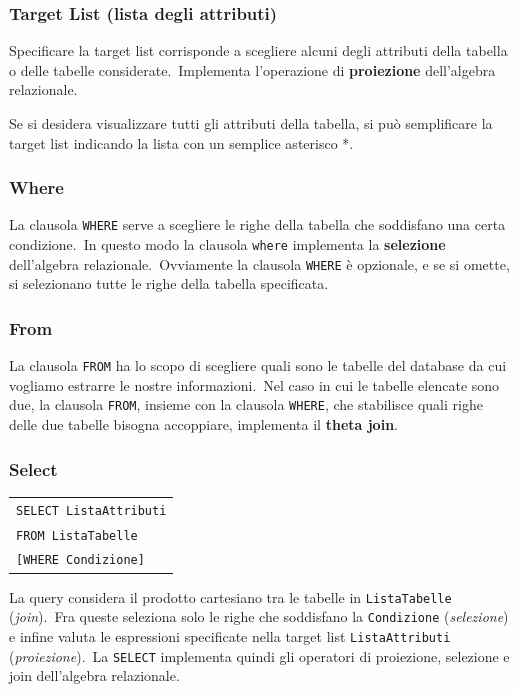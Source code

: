 \subsubsection{Target List (lista degli attributi)}

Specificare la target list corrisponde a scegliere alcuni degli attributi della tabella o delle tabelle considerate.\
Implementa l'operazione di \textbf{proiezione} dell'algebra relazionale.

Se si desidera visualizzare tutti gli attributi della tabella, si può semplificare la target list indicando la lista con un semplice asterisco *.\
\subsubsection{Where}

La clausola \texttt{WHERE} serve a scegliere le righe della tabella che soddisfano una certa condizione.\
In questo modo la clausola \texttt{where} implementa la \textbf{selezione} dell'algebra relazionale.\
Ovviamente la clausola \texttt{WHERE} è opzionale, e se si omette, si selezionano tutte le righe della tabella specificata.

\subsubsection{From}

La clausola \texttt{FROM} ha lo scopo di scegliere quali sono le tabelle del database da cui vogliamo estrarre le nostre informazioni.\
Nel caso in cui le tabelle elencate sono due, la clausola \texttt{FROM}, insieme con la clausola \texttt{WHERE}, che stabilisce quali righe delle due tabelle bisogna accoppiare, implementa il \textbf{theta join}.

\subsubsection{Select}
\begin{table}[H]
	\centering
	\begin{tabular}{l}
		\texttt{SELECT ListaAttributi} \\
		\texttt{FROM ListaTabelle}     \\
		\texttt{[WHERE Condizione]}    \\
	\end{tabular}
\end{table}
La query considera il prodotto cartesiano tra le tabelle in \texttt{ListaTabelle} (\textit{join}).\
Fra queste seleziona solo le righe che soddisfano la \texttt{Condizione} (\textit{selezione}) e infine valuta le espressioni specificate nella target list \texttt{ListaAttri\-buti} (\textit{proiezione}).\
La \texttt{SELECT} implementa quindi gli operatori di proiezione, selezione e join dell'algebra relazionale.\

